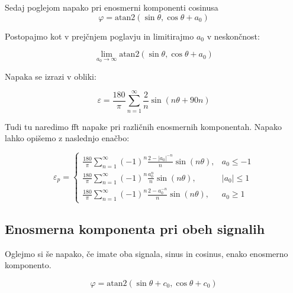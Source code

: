 Sedaj poglejom napako pri enosmerni komponenti cosinusa
\begin{equation}
\varphi = \mathrm{atan2}(\sin{\theta},\cos{\theta} + a_0)
\end{equation}

Postopajmo kot v prejčnjem poglavju in limitirajmo $a_0$ v neskončnost:

\begin{equation}
\lim_{a_0 \rightarrow \infty} \mathrm{atan2}(\sin{\theta},\cos{\theta} + a_0)
\end{equation}

Napaka se izrazi v obliki:

\begin{equation}
\varepsilon = \frac{180}{\pi}\sum_{n=1}^{\infty}\frac{2}{n} \sin (n \theta+ 90 n)
\end{equation}


Tudi tu naredimo fft napake pri različnih enosmernih komponentah. Napako lahko opišemo z naslednjo enačbo:

\begin{equation}
\label{vrsta_cosoff}
\varepsilon_p=
\begin{cases}
\frac{180}{\pi}\sum_{n=1}^{\infty}(-1)^n\frac{2-|a_0|^{-n}}{n} \sin (n \theta ), & a_0\leq -1 \\
\frac{180}{\pi}\sum_{n=1}^{\infty}(-1)^n\frac{a_0^n}{n} \sin (n \theta ), & |a_0|\leq 1 \\
\frac{180}{\pi}\sum_{n=1}^{\infty}(-1)^n\frac{2-a_0^{-n}}{n} \sin (n \theta ), & a_0\geq 1
\end{cases}
\end{equation}


\newpage
\subsection{Enosmerna komponenta pri obeh signalih}
\label{2_offseta}
Oglejmo si še napako, če imate oba signala, sinus in cosinus, enako enosmerno komponento.


\begin{equation}
\varphi = \mathrm{atan2}(\sin{\theta} + c_0,\cos{\theta} + c_0)
\end{equation}

